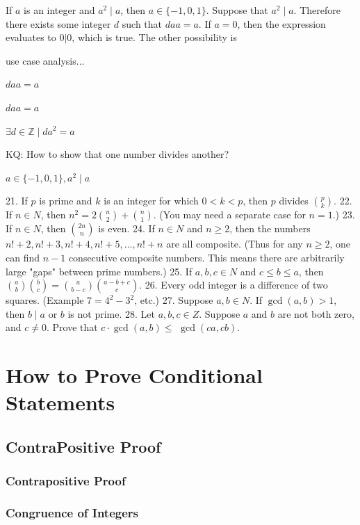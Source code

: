 \documentclass[openany, 12pt]{book}
\begin{document}
\begin{exercise}{}{}
	If $a$ is an integer and $a^2 \mid a$, then $a \in\{-1,0,1\}$.
	\tcblower
	Suppose that $a^2 \mid a$. Therefore there exists some integer $d$ such that
	$daa=a$. If $a=0$, then the expression evaluates to $0|0$, which is true.
	The other possibility is

	use case analysis...

	\begin{alist}
		\item $daa=a$
		\item $daa=a$
		\item $\exists d\in\mathbb{Z}\mid da^2=a$
		\item KQ: How to show that one number divides another?
		\item $a \in\{-1,0,1\}, a^2 \mid a$
	\end{alist}
\end{exercise}
21. If $p$ is prime and $k$ is an integer for which $0<k<p$, then $p$ divides $\binom{p}{k}$.
22. If $n \in N$, then $n^2=2\binom{n}{2}+\binom{n}{1}$. (You may need a separate case for $n=1$.)
23. If $n \in N$, then $\binom{2 n}{n}$ is even.
24. If $n \in N$ and $n \geq 2$, then the numbers $n!+2, n!+3, n!+4, n!+5, \ldots, n!+n$ are all composite. (Thus for any $n \geq 2$, one can find $n-1$ consecutive composite numbers. This means there are arbitrarily large "gaps" between prime numbers.)
25. If $a, b, c \in N$ and $c \leq b \leq a$, then $\binom{a}{b}\binom{b}{c}=\binom{a}{b-c}\binom{a-b+c}{c}$.
26. Every odd integer is a difference of two squares. (Example $7=4^2-3^2$, etc.)
27. Suppose $a, b \in N$. If $\operatorname{gcd}(a, b)>1$, then $b \mid a$ or $b$ is not prime.
28. Let $a, b, c \in Z$. Suppose $a$ and $b$ are not both zero, and $c \neq 0$. Prove that $c \cdot \operatorname{gcd}(a, b) \leq$ $\operatorname{gcd}(c a, c b)$.

\setcounter{chapter}{4}
\part{How to Prove Conditional Statements}
\chapter{ContraPositive Proof}
\section{Contrapositive Proof}
\section{Congruence of Integers}
\end{document}
